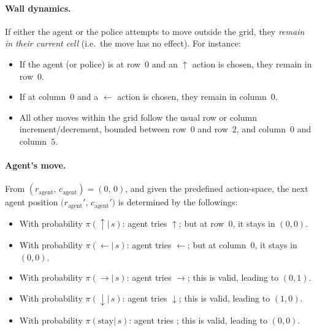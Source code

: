 \begin{enumerate}
    \paragraph{Wall dynamics.}
    If either the agent or the police attempts to move outside the grid, 
    they \emph{remain in their current cell} (i.e.\ the move has no effect).
    For instance:
    \begin{itemize}
      \item If the agent (or police) is at row~0 and an \(\uparrow\) action is chosen,
            they remain in row~0.
      \item If at column~0 and a \(\leftarrow\) action is chosen,
            they remain in column~0.
      \item All other moves within the grid follow the usual row or column increment/decrement,
            bounded between row~\(0\) and row~\(2\), and column~\(0\) and column~\(5\).
    \end{itemize}
    
    \paragraph{Agent's move.}
    From \((r_{\text{agent}},\,c_{\text{agent}}) = (0,\,0)\), 
    and given the predefined action-space, the next agent position 
    \(\bigl(r_{\text{agent}}',\,c_{\text{agent}}'\bigr)\) is determined by the followings:
    \begin{itemize}
      \item With probability \(\pi(\uparrow\lvert\,s)\): agent tries \(\uparrow\); 
            but at row~0, it stays in \((0,0)\).
      \item With probability \(\pi(\leftarrow\lvert\,s)\): agent tries \(\leftarrow\); 
            but at column~0, it stays in \((0,0)\).
      \item With probability \(\pi(\rightarrow\lvert\,s)\): agent tries \(\rightarrow\); 
            this is valid, leading to \((0,1)\).
      \item With probability \(\pi(\downarrow\lvert\,s)\): agent tries \(\downarrow\); 
            this is valid, leading to \((1,0)\).
      \item With probability \(\pi(\text{stay}\lvert\,s)\): agent tries ; 
            this is valid, leading to \((0,0)\).
      
    \end{itemize}


\end{enumerate}
